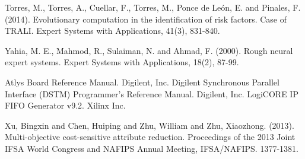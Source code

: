 \documentclass[authoryear,preprint,review,12pt]{elsarticle}
\begin{document}
\begin{thebibliography}{00}
Torres, M., Torres, A., Cuellar, F., Torres, M., Ponce de Le\'on, E. and Pinales, F. (2014). Evolutionary computation in the identification of risk factors. Case of TRALI. Expert Systems with Applications, 41(3), 831-840.

Yahia, M. E., Mahmod, R., Sulaiman, N. and Ahmad, F. (2000). Rough neural expert systems. Expert Systems with Applications, 18(2), 87-99.

Atlys Board Reference Manual. Digilent, Inc.
Digilent Synchronous Parallel Interface (DSTM) Programmer's Reference Manual. Digilent, Inc.
LogiCORE IP FIFO Generator v9.2. Xilinx Inc.

Xu, Bingxin and Chen, Huiping and Zhu, William and Zhu, Xiaozhong. (2013). Multi-objective cost-sensitive attribute reduction. Proceedings of the 2013 Joint IFSA World Congress and NAFIPS Annual Meeting, IFSA/NAFIPS. 1377-1381.

\end{thebibliography}
\end{document}
